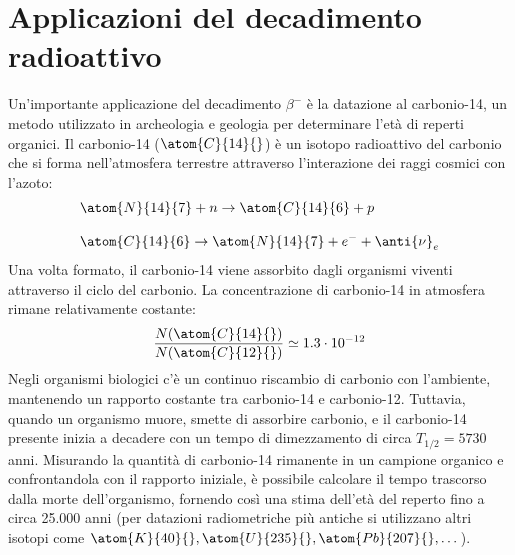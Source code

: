 \section{Applicazioni del decadimento radioattivo}
Un'importante applicazione del decadimento $\beta^-$ è la datazione al carbonio-14, un metodo utilizzato in archeologia e geologia per determinare l'età di reperti organici. Il carbonio-14 ($\atom{C}{14}{}$) è un isotopo radioattivo del carbonio che si forma nell'atmosfera terrestre attraverso l'interazione dei raggi cosmici con l'azoto:
\begin{equation}
    \begin{split}
        &\atom{N}{14}{7} + n \to \atom{C}{14}{6} + p \\[8pt]
        &\atom{C}{14}{6} \to \atom{N}{14}{7} + e^- + \anti{\nu}_{e}
    \end{split}
\end{equation}
Una volta formato, il carbonio-14 viene assorbito dagli organismi viventi attraverso il ciclo del carbonio. La concentrazione di carbonio-14 in atmosfera rimane relativamente costante:
\begin{equation}
    \dfrac{N(\atom{C}{14}{})}{N(\atom{C}{12}{})} \simeq 1.3 \cdot 10^{-12}
\end{equation}
Negli organismi biologici c'è un continuo riscambio di carbonio con l'ambiente, mantenendo un rapporto costante tra carbonio-14 e carbonio-12. Tuttavia, quando un organismo muore, smette di assorbire carbonio, e il carbonio-14 presente inizia a decadere con un tempo di dimezzamento di circa $T_{1/2} = 5730$ anni. Misurando la quantità di carbonio-14 rimanente in un campione organico e confrontandola con il rapporto iniziale, è possibile calcolare il tempo trascorso dalla morte dell'organismo, fornendo così una stima dell'età del reperto fino a circa 25.000 anni (per datazioni radiometriche più antiche si utilizzano altri isotopi come $\atom{K}{40}{}, \atom{U}{235}{}, \atom{Pb}{207}{}, \dots$). %

